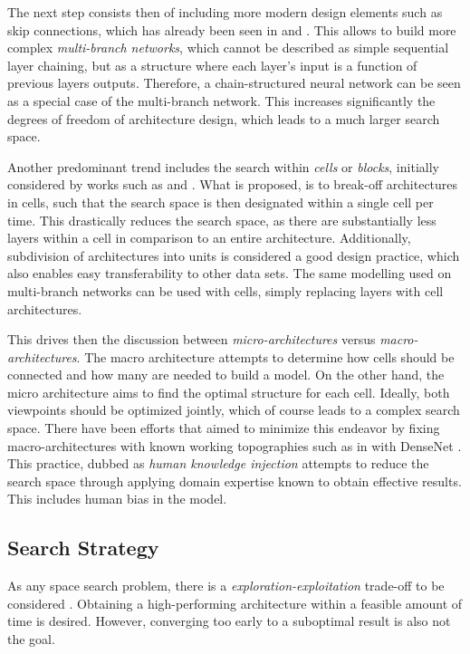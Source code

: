 \documentclass[10pt,        %
               a4paper,     %
               journal,     %
               ]{IEEEtran}
\begin{document}
The next step consists then of including more modern design elements such as skip connections, which has already been seen
in \cite{zoph2016neural} and \cite{pmlr-v70-real17a}. This allows to build more complex \textit{multi-branch networks}, which
cannot be described as simple sequential layer chaining, but as a structure where each layer's input is a function of
previous layers outputs. Therefore, a chain-structured neural network can be seen as a special case of the multi-branch network.
This increases significantly the degrees of freedom of architecture design, which leads to a much larger search space.

Another predominant trend includes the search within \textit{cells} or \textit{blocks}, initially considered by works such as
\cite{zhong2018practical} and \cite{zoph2018learning}. What is proposed, is to break-off architectures in cells, such that
the search space is then designated within a single cell per time. This drastically reduces the search space, as there are
substantially less layers within a cell in comparison to an entire architecture. Additionally, subdivision of architectures
into units is considered a good design practice, which also enables easy transferability to other data sets. The same
modelling used on multi-branch networks can be used with cells, simply replacing layers with cell architectures.

This drives then the discussion between \textit{micro-architectures} versus \textit{macro-architectures}. The macro architecture
attempts to determine how cells should be connected and how many are needed to build a model. On the other hand, the micro
architecture aims to find the optimal structure for each cell. Ideally, both viewpoints should be optimized jointly, which of course
leads to a complex search space. There have been efforts that aimed to minimize this endeavor by fixing macro-architectures with
known working topographies such as in \cite{pmlr-v80-cai18a} with DenseNet \cite{Huang_2017_CVPR}. This practice, dubbed as
\textit{human knowledge injection} attempts to reduce the search space through applying domain expertise known to obtain
effective results. This includes human bias in the model.

\subsection{Search Strategy}
As any space search problem, there is a \textit{exploration-exploitation} trade-off to be considered \cite{wistuba2019survey}.
Obtaining a high-performing architecture within a feasible amount of time is desired. However, converging too early to a
suboptimal result is also not the goal.
\end{document}
